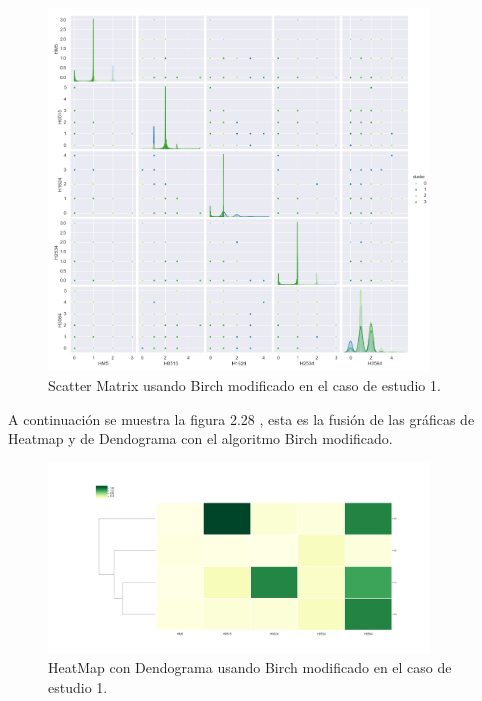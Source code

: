 	\begin{figure}[htb]
		\centering
		\includegraphics[width=0.9\textwidth]{./imagenes/caso1/scatterMatrix_caso1_Birch_modificado}
		\caption{Scatter Matrix usando Birch modificado en el caso de estudio 1.} \label{fig:1}
	\end{figure}
	
	A continuación se muestra la figura 2.28 , esta es la fusión de las gráficas de 
	Heatmap y de Dendograma con el algoritmo Birch modificado.  \\

	\begin{figure}[htb]
		\centering
		\includegraphics[width=0.9\textwidth]{./imagenes/caso1/heatmapcondendograma_caso1_Birch_modificado}
		\caption{HeatMap con Dendograma usando Birch modificado en el caso de estudio 1.} \label{fig:1}
	\end{figure}

